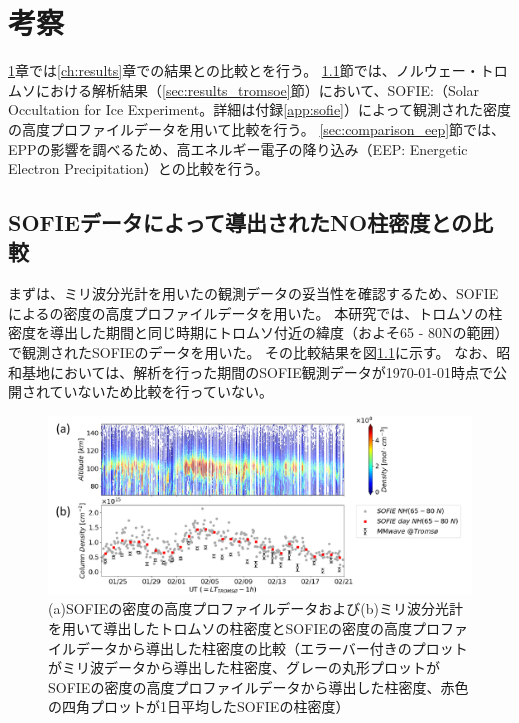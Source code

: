 \chapter{考察}
\label{ch:discussion}
\ref{ch:discussion}章では\ref{ch:results}章での結果との比較とを行う。
\ref{sec:comparison_sofie}節では、ノルウェー・トロムソにおける解析結果（\ref{sec:results_tromsoe}節）において、SOFIE:（Solar Occultation for Ice Experiment。詳細は付録\ref{app:sofie}）によって観測された密度の高度プロファイルデータを用いて比較を行う。
\ref{sec:comparison_eep}節では、EPPの影響を調べるため、高エネルギー電子の降り込み（EEP: Energetic Electron Precipitation）との比較を行う。


\section{SOFIEデータによって導出されたNO柱密度との比較}
\label{sec:comparison_sofie}
まずは、ミリ波分光計を用いたの観測データの妥当性を確認するため、SOFIEによるの密度の高度プロファイルデータを用いた。
本研究では、トロムソの柱密度を導出した期間と同じ時期にトロムソ付近の緯度（およそ65 - 80\textdegree Nの範囲）で観測されたSOFIEのデータを用いた。
その比較結果を図\ref{fig:sofie_mmcd}に示す。
なお、昭和基地においては、解析を行った期間のSOFIE観測データが\today 時点で公開されていないため比較を行っていない。
\begin{figure}[htbp]
    \centering
    \includegraphics[width=\linewidth]{master_thesis_contents/master_thesis_fig/sofie_mmcd.pdf}
    \caption{(a)SOFIEの密度の高度プロファイルデータおよび(b)ミリ波分光計を用いて導出したトロムソの柱密度とSOFIEの密度の高度プロファイルデータから導出した柱密度の比較（エラーバー付きのプロットがミリ波データから導出した柱密度、グレーの丸形プロットがSOFIEの密度の高度プロファイルデータから導出した柱密度、赤色の四角プロットが1日平均したSOFIEの柱密度）}
    \label{fig:sofie_mmcd}
\end{figure}
